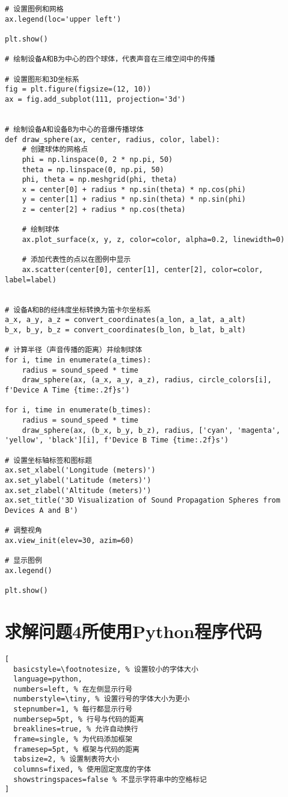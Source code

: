 \documentclass[withoutpreface,bwprint,12pt,a4paper]{cumcmthesis}
\begin{document}
\begin{appendices}
\begin{lstlisting}
# 设置图例和网格
ax.legend(loc='upper left')

plt.show()

# 绘制设备A和B为中心的四个球体，代表声音在三维空间中的传播

# 设置图形和3D坐标系
fig = plt.figure(figsize=(12, 10))
ax = fig.add_subplot(111, projection='3d')


# 绘制设备A和设备B为中心的音爆传播球体
def draw_sphere(ax, center, radius, color, label):
    # 创建球体的网格点
    phi = np.linspace(0, 2 * np.pi, 50)
    theta = np.linspace(0, np.pi, 50)
    phi, theta = np.meshgrid(phi, theta)
    x = center[0] + radius * np.sin(theta) * np.cos(phi)
    y = center[1] + radius * np.sin(theta) * np.sin(phi)
    z = center[2] + radius * np.cos(theta)

    # 绘制球体
    ax.plot_surface(x, y, z, color=color, alpha=0.2, linewidth=0)

    # 添加代表性的点以在图例中显示
    ax.scatter(center[0], center[1], center[2], color=color, label=label)


# 设备A和B的经纬度坐标转换为笛卡尔坐标系
a_x, a_y, a_z = convert_coordinates(a_lon, a_lat, a_alt)
b_x, b_y, b_z = convert_coordinates(b_lon, b_lat, b_alt)

# 计算半径（声音传播的距离）并绘制球体
for i, time in enumerate(a_times):
    radius = sound_speed * time
    draw_sphere(ax, (a_x, a_y, a_z), radius, circle_colors[i], f'Device A Time {time:.2f}s')

for i, time in enumerate(b_times):
    radius = sound_speed * time
    draw_sphere(ax, (b_x, b_y, b_z), radius, ['cyan', 'magenta', 'yellow', 'black'][i], f'Device B Time {time:.2f}s')

# 设置坐标轴标签和图标题
ax.set_xlabel('Longitude (meters)')
ax.set_ylabel('Latitude (meters)')
ax.set_zlabel('Altitude (meters)')
ax.set_title('3D Visualization of Sound Propagation Spheres from Devices A and B')

# 调整视角
ax.view_init(elev=30, azim=60)

# 显示图例
ax.legend()

plt.show()

 \end{lstlisting}

\section{求解问题4所使用Python程序代码}

\begin{lstlisting}[
  basicstyle=\footnotesize, % 设置较小的字体大小
  language=python,
  numbers=left, % 在左侧显示行号
  numberstyle=\tiny, % 设置行号的字体大小为更小
  stepnumber=1, % 每行都显示行号
  numbersep=5pt, % 行号与代码的距离
  breaklines=true, % 允许自动换行
  frame=single, % 为代码添加框架
  framesep=5pt, % 框架与代码的距离
  tabsize=2, % 设置制表符大小
  columns=fixed, % 使用固定宽度的字体
  showstringspaces=false % 不显示字符串中的空格标记
]



\end{lstlisting}
\end{appendices}
\end{document}
